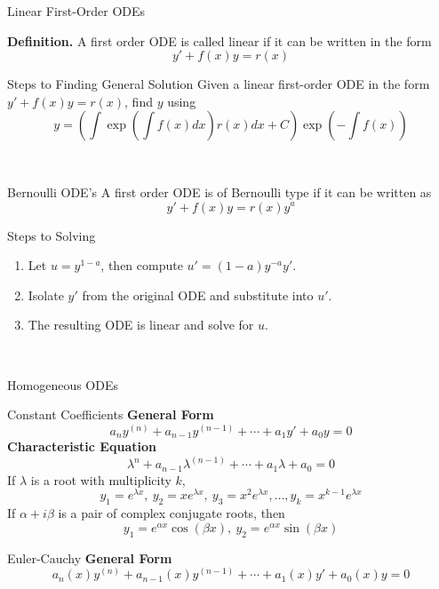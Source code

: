 \documentclass{article}
\begin{document}
\begin{multicols*}{3}
\begin{blackbox}{Linear First-Order ODEs}
{    \textbf{Definition.} A first order ODE is called linear if it can be written in the form\\[-2ex]
    \[y' + f(x)y = r(x)\]
    \begin{bluebox}{Steps to Finding General Solution}
        Given a linear first-order ODE in the form $y' + f(x)y = r(x)$, find $y$ using 
        \[y = \left(\int \exp\left(\int f(x)dx\right)r(x)dx + C\right)\exp\left(-\int f(x)\right)\]
    \end{bluebox}\\[-2ex]
    }
\end{blackbox} 
\begin{blackbox}{Bernoulli ODE's}
    A first order ODE is of Bernoulli type if it can be written as \\[-4ex]
    \[y' + f(x)y= r(x)y^a\]
    \begin{redbox}{Steps to Solving}
        \begin{enumerate}[leftmargin=7pt]
            \item Let $u = y^{1-a}$, then compute $u' = (1-a)y^{-a}y'$.
            \item Isolate $y'$ from the original ODE and substitute into $u'$. 
            \item The resulting ODE is linear and solve for $u$.
        \end{enumerate}
    \end{redbox}\\[-2ex]
\end{blackbox}
\begin{blackbox}{Homogeneous ODEs}
    {\footnotesize
    \begin{bluebox}{Constant Coefficients}
        \textbf{General Form}\\[-2ex]
        \[a_ny^{(n)} + a_{n-1}y^{(n-1)} + \cdots + a_1y' + a_0y = 0\]
        \textbf{Characteristic Equation}\\[-2ex]
        \[\lambda^n + a_{n-1}\lambda^{(n-1)} + \cdots + a_1\lambda + a_0 = 0\]
        If $\lambda$ is a root with multiplicity $k$, 
        \[y_1 = e^{\lambda x}, \ y_2 = xe^{\lambda x}, \ y_3 = x^2e^{\lambda x}, \ldots, y_k = x^{k-1}e^{\lambda x}\]
        If $\alpha + i\beta$ is a pair of complex conjugate roots, then
        \[y_1 = e^{\alpha x}\cos(\beta x), \ y_2 = e^{\alpha x}\sin(\beta x)\]
    \end{bluebox}
    \begin{brownbox}{Euler-Cauchy}
        \textbf{General Form}\\[-2ex]
        \[a_n(x)y^{(n)} + a_{n-1}(x)y^{(n-1)} + \cdots + a_1(x)y' + a_0(x)y = 0\]

\end{brownbox}}
\end{blackbox}
\end{multicols*}
\end{document}
